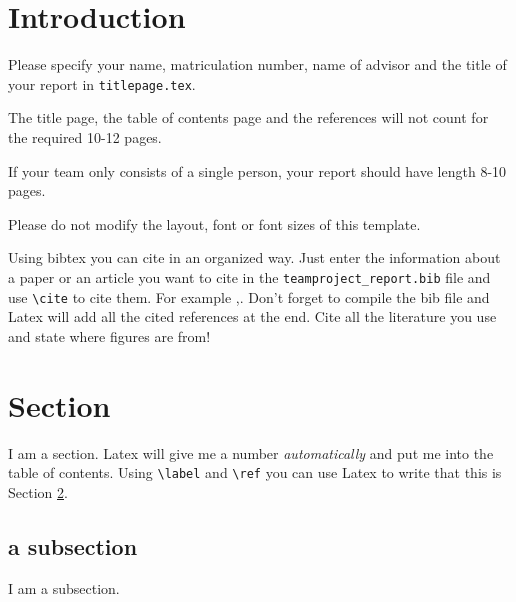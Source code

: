 \documentclass[twoside,a4paper,article]{combine}
\begin{document}


\begin{abstract}
\end{abstract}

\tableofcontents
\newpage


\section{Introduction}

Please specify your name, matriculation number, name of advisor and the title of your report in \linebreak
\verb+titlepage.tex+.

The title page, the table of contents page and the references will not count for the required 10-12 pages.

If your team only consists of a single person, your report should have length 8-10 pages.

Please do not modify the layout, font or font sizes of this template.

Using bibtex you can cite in an organized way.
Just enter the information about a paper or an article you want to cite in the \verb+teamproject_report.bib+ file and use \verb+\cite+ to cite them. For example \cite{Author08CVPR},\cite{Author04IJCV}.
Don't forget to compile the bib file and Latex will add all the cited references at the end.
Cite all the literature you use and state where figures are from!


\section{Section}
\label{section}
I am a section. Latex will give me a number \emph{automatically} and put me into the table of contents.
Using \verb+\label+ and \verb+\ref+ you can use Latex to write that this is Section \ref{section}.

\subsection{a subsection}
I am a subsection.
\end{document}

